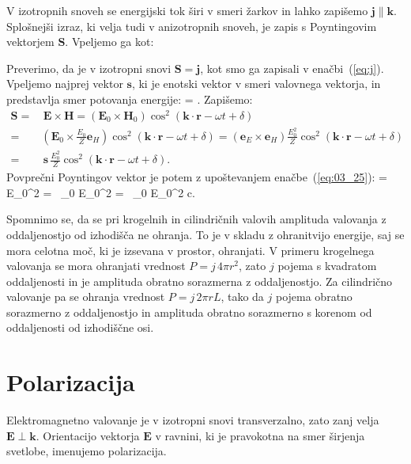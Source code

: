 V izotropnih snoveh se energijski tok širi v smeri žarkov in lahko zapišemo 
$\mathbf{j}\parallel \mathbf{k}$. Splošnejši izraz, ki velja tudi v anizotropnih snoveh, je
zapis s Poyntingovim vektorjem $\mathbf{S}$. Vpeljemo ga kot:

Preverimo, da je v izotropni snovi $\mathbf{S} = \mathbf{j}$, kot smo ga zapisali 
v enačbi~(\ref{eq:j}). Vpeljemo najprej vektor $\mathbf{s}$, ki je enotski vektor
v smeri valovnega vektorja, in predstavlja smer potovanja energije:
\beq
{} = .
\label{eq:03_34}
\eeq
Zapišemo:
\begin{align}
\mathbf{S}= &\, \mathbf{E}\times \mathbf{H} = \left( \mathbf{E}_0\times \mathbf{H}_0 \right)
\cos^2 \left(\mathbf{k}\cdot \mathbf{r} - \omega t + \delta\right) \\
= & \left(  \mathbf{E}_0 \times \frac{E_0}{Z}\mathbf{e}_H \right) 
\cos^2 \left(\mathbf{k}\cdot \mathbf{r} - \omega t + \delta\right) = 
\left(  \mathbf{e}_E \times \mathbf{e}_H \right)\frac{E_0^2}{Z} 
\cos^2 \left(\mathbf{k}\cdot \mathbf{r} - \omega t + \delta\right)
\\
= &\, \mathbf{s}\, \frac{E_0^2}{Z} \cos^2 \left(\mathbf{k}\cdot \mathbf{r} - \omega t + \delta\right).
\label{eq:03_35}
\end{align}
Povprečni Poyntingov vektor je potem z upoštevanjem enačbe~(\ref{eq:03_25}):
\beq
{} = \, E_0^2 
  = 
\,  \varepsilon \varepsilon_0 E_0^2   = 
\, \varepsilon \varepsilon_0 E_0^2 c.
\label{eq:03_36}
\eeq

\begin{remark}
Spomnimo se, da se pri krogelnih in cilindričnih valovih amplituda valovanja
z oddaljenostjo od izhodišča ne ohranja. To je v skladu z ohranitvijo energije, saj 
se mora celotna moč, ki je izsevana v prostor, ohranjati. V primeru krogelnega
valovanja se mora ohranjati vrednost $P = j\,4 \pi r^2$, zato $j$ pojema s kvadratom
oddaljenosti in je amplituda obratno sorazmerna z oddaljenostjo. Za cilindrično
valovanje pa se ohranja vrednost $P = j\,2\pi r L$, tako da $j$ pojema obratno
sorazmerno z oddaljenostjo in amplituda obratno sorazmerno s korenom od oddaljenosti
od izhodiščne osi. 
\end{remark}

\section{Polarizacija}
Elektromagnetno valovanje je v izotropni snovi 
transverzalno, zato zanj velja $\mathbf{E} \perp \mathbf{k}$. Orientacijo 
vektorja $\mathbf{E}$ v ravnini, ki je pravokotna na smer
širjenja svetlobe, imenujemo polarizacija.

